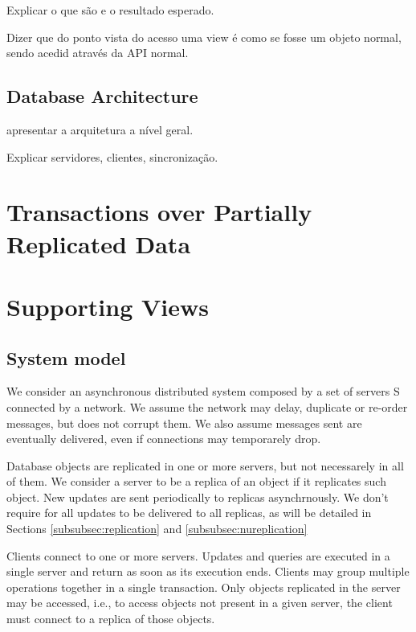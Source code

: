 \documentclass{vldb}
\begin{document}
Explicar o que são e o resultado esperado.

Dizer que do ponto vista do acesso uma view é como se fosse um objeto normal, sendo 
acedid através da API normal.


\subsection{Database Architecture} 

apresentar a arquitetura a nível geral.

Explicar servidores, clientes, sincronização.

\section{Transactions over Partially Replicated Data}


\section{Supporting Views}



\subsection{System model}

We consider an asynchronous distributed system composed by a set of servers S connected by a network. 
We assume the network may delay, duplicate or re-order messages, but does not corrupt them. 
We also assume messages sent are eventually delivered, even if connections may temporarely drop.

Database objects are replicated in one or more servers, but not necessarely in all of them.  
We consider a server to be a replica of an object if it replicates such object. 
New updates are sent periodically to replicas asynchrnously. 
We don't require for all updates to be delivered to all replicas, as will be detailed in Sections \ref{subsubsec:replication} and \ref{subsubsec:nureplication}

Clients connect to one or more servers. 
Updates and queries are executed in a single server and return as soon as its execution ends.
Clients may group multiple operations together in a single transaction.
Only objects replicated in the server may be accessed, i.e., to access objects not present in a given server, the client must connect to a replica of those objects.
\end{document}
